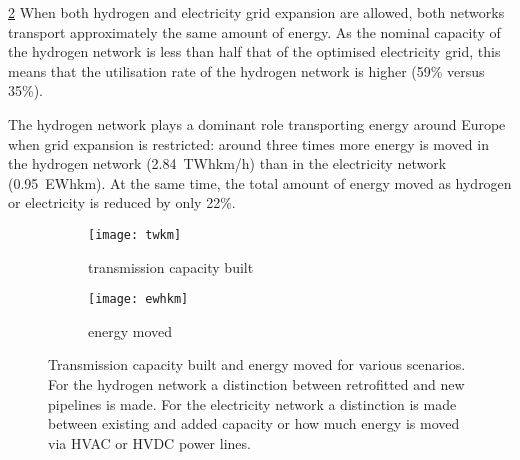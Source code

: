 \cref{fig:network-stats:ewhkm}
When both hydrogen and electricity grid expansion are allowed, both networks
transport approximately the same amount of energy. As the nominal capacity of
the hydrogen network is less than half that of the optimised electricity grid,
this means that the utilisation rate of the hydrogen network is higher (59\%
versus 35\%).

The hydrogen network plays a dominant role transporting energy around Europe
when grid expansion is restricted: around three times more energy is moved in
the hydrogen network (2.84~TWhkm/h) than in the electricity network
(0.95~EWhkm). At the same time, the total amount of energy moved as hydrogen or
electricity is reduced by only 22\%.

\begin{figure}
    \centering
    \begin{subfigure}[t]{0.49\textwidth}
        \centering
        \caption{transmission capacity built}
        \texttt{[image: twkm]}
        \label{fig:network-stats:twkm}
    \end{subfigure}
    \begin{subfigure}[t]{0.49\textwidth}
        \centering
        \caption{energy moved}
        \texttt{[image: ewhkm]}
        \label{fig:network-stats:ewhkm}
    \end{subfigure}
    \caption{Transmission capacity built and energy moved for various scenarios.
    For the hydrogen network a distinction between retrofitted and new pipelines is made.
    For the electricity network a distinction is made between existing and added capacity
    or how much energy is moved via HVAC or HVDC power lines.}
    \label{fig:network-stats}
\end{figure}

